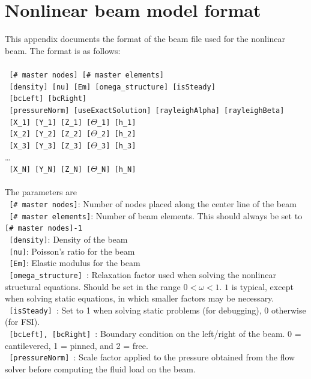\documentclass{article}
\begin{document}
\section{Nonlinear beam model format}
This appendix documents the format of the beam file used for the nonlinear beam.
The format is as follows: \\ \\
\texttt{ [\# master nodes] [\# master elements]} \\
\texttt{ [density] [nu] [Em] [omega\_structure] [isSteady]} \\
\texttt{ [bcLeft] [bcRight] } \\
\texttt{ [pressureNorm] [useExactSolution] [rayleighAlpha] [rayleighBeta] } \\
\texttt{ [X\_1] [Y\_1] [Z\_1] [$\Theta$\_1] [h\_1]} \\
\texttt{ [X\_2] [Y\_2] [Z\_2] [$\Theta$\_2] [h\_2]} \\
\texttt{ [X\_3] [Y\_3] [Z\_3] [$\Theta$\_3] [h\_3]} \\
\ldots \\
\texttt{ [X\_N] [Y\_N] [Z\_N] [$\Theta$\_N] [h\_N]} \\ \\
The parameters are  \\
\texttt{ [\# master nodes]}: Number of nodes placed along the center line of the beam \\
\texttt{ [\# master elements]}: Number of beam elements.  This should always be set to \texttt{ [\# master nodes]-1} \\
\texttt{ [density]}: Density of the beam \\
\texttt{ [nu]}: Poisson's ratio for the beam \\
\texttt{ [Em]}: Elastic modulus for the beam \\
\texttt{ [omega\_structure] }: Relaxation factor used when solving the nonlinear structural equations.  Should be set in the range $0 < \omega < 1$.  $1$ is typical, except when solving static equations, in which smaller factors may be necessary. \\
\texttt{ [isSteady] }: Set to 1 when solving static problems (for debugging), 0 otherwise (for FSI). \\
\texttt{ [bcLeft], [bcRight] }: Boundary condition on the left/right of the beam.  0 = cantilevered, 1 = pinned, and 2 = free. \\
\texttt{ [pressureNorm] }: Scale factor applied to the pressure obtained from the flow solver before computing the fluid load on the beam. \\
\end{document}
